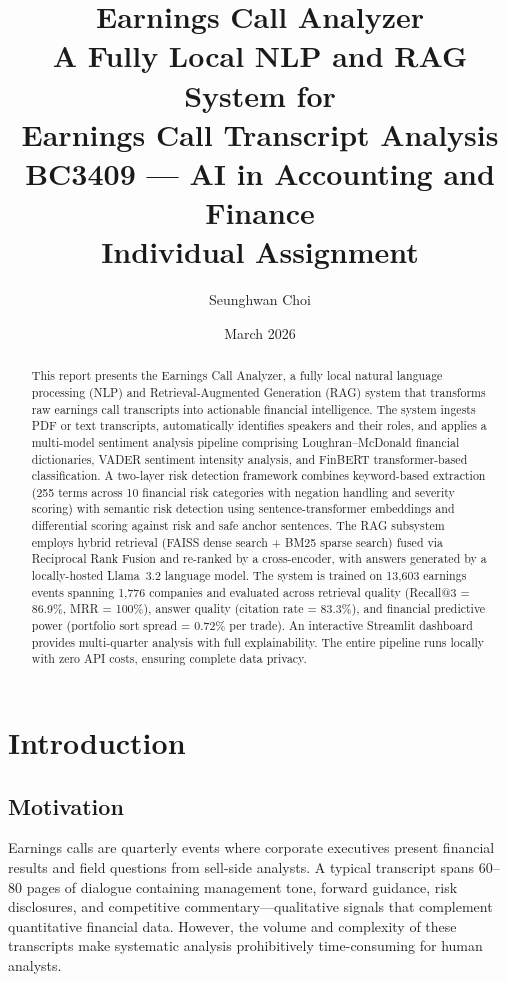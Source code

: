 \documentclass[12pt,a4paper]{article}
\title{%
    \vspace{-1cm}
    \textbf{Earnings Call Analyzer} \\[0.3cm]
    \Large A Fully Local NLP and RAG System for \\
    Earnings Call Transcript Analysis \\[0.5cm]
    \large BC3409 --- AI in Accounting and Finance \\
    Individual Assignment
}
\author{Seunghwan Choi}
\date{March 2026}
\begin{document}
\maketitle
\thispagestyle{empty}

\begin{abstract}
This report presents the Earnings Call Analyzer, a fully local natural language processing (NLP) and Retrieval-Augmented Generation (RAG) system that transforms raw earnings call transcripts into actionable financial intelligence. The system ingests PDF or text transcripts, automatically identifies speakers and their roles, and applies a multi-model sentiment analysis pipeline comprising Loughran--McDonald financial dictionaries, VADER sentiment intensity analysis, and FinBERT transformer-based classification. A two-layer risk detection framework combines keyword-based extraction (255 terms across 10 financial risk categories with negation handling and severity scoring) with semantic risk detection using sentence-transformer embeddings and differential scoring against risk and safe anchor sentences. The RAG subsystem employs hybrid retrieval (FAISS dense search + BM25 sparse search) fused via Reciprocal Rank Fusion and re-ranked by a cross-encoder, with answers generated by a locally-hosted Llama~3.2 language model. The system is trained on 13,603 earnings events spanning 1,776 companies and evaluated across retrieval quality (Recall@3 = 86.9\%, MRR = 100\%), answer quality (citation rate = 83.3\%), and financial predictive power (portfolio sort spread = 0.72\% per trade). An interactive Streamlit dashboard provides multi-quarter analysis with full explainability. The entire pipeline runs locally with zero API costs, ensuring complete data privacy.
\end{abstract}

\newpage
\tableofcontents
\newpage

\section{Introduction}
\label{sec:intro}

\subsection{Motivation}

Earnings calls are quarterly events where corporate executives present financial results and field questions from sell-side analysts. A typical transcript spans 60--80 pages of dialogue containing management tone, forward guidance, risk disclosures, and competitive commentary---qualitative signals that complement quantitative financial data. However, the volume and complexity of these transcripts make systematic analysis prohibitively time-consuming for human analysts.
\end{document}
